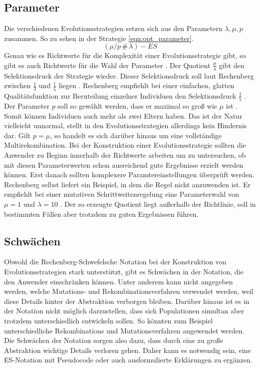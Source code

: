 \subsection{Parameter}
Die verschiedenen Evolutionsstrategien setzen sich aus den Parametern $\lambda, \mu, p$ zusammen. So zu sehen in der Strategie \ref{eqn:opt_parameter}.
\begin{equation}
\label{eqn:opt_parameter}
(\mu/p\,\#\,\lambda)-ES
\end{equation}
Genau wie es Richtwerte für die Komplexität einer Evolutionsstrategie gibt, so gibt es auch Richtwerte für die Wahl der Parameter \cite[S.166]{schoeneburg}.
Der Quotient $\frac{\mu}{\lambda}$ gibt den Selektionsdruck der Strategie wieder. Dieser Selektionsdruck soll laut Rechenberg zwischen $\frac{1}{3}$ und $\frac{1}{5}$ liegen  \cite[S.166]{schoeneburg}. Rechenberg empfiehlt bei einer einfachen, glatten Qualitätsfunktion zur Beruteilung einzelner Individuen den Selektionsdruck  $\frac{1}{5}$  \cite[S.166]{schoeneburg}.
Der Parameter $p$ soll so gewählt werden, dass er maximal so groß wie $\mu$ ist  \cite[S.166]{schoeneburg}. Somit können Individuen auch mehr als zwei Eltern haben. Das ist der Natur vielleicht unnormal, stellt in den Evolutionsstrategien allerdings kein Hindernis dar. Gilt $p=\mu$, so handelt es sich darüber hinaus um eine vollständige Multirekombination.
Bei der Konstruktion einer Evolutionsstrategie sollten die Anwender zu Beginn innerhalb der Richtwerte arbeiten um zu untersuchen, ob mit diesen Parameterwerten schon ausreichend gute Ergebnisse erzielt werden können. Erst danach sollten komplexere Paramtereinstellungen überprüft werden.
Rechenberg selbst liefert ein Beispiel, in dem die Regel nicht anzuwenden ist. Er empfiehlt bei einer mutativen Schrittweitenregelung eine Parameterwahl von $\mu=1$ und $\lambda=10$ \cite[S.166]{schoeneburg}. Der so erzeugte Quotient liegt außerhalb der Richtlinie, soll in bestimmten Fällen aber trotzdem zu guten Ergebnissen führen.

\subsection{Schwächen}
Obwohl die Rechenberg-Schwefelsche Notation bei der Konstruktion von Evolutionsstrategien stark unterstützt, gibt es Schwächen in der Notation, die den Anwender einschränken können.
Unter anderem kann nicht angegeben werden, welche Mutations- und Rekombinationsverfahren verwendet werden, weil diese Details hinter der Abstraktion verborgen bleiben.
Darüber hinaus ist es in der Notation nicht möglich darzustellen, dass sich Populationen simultan aber trotzdem unterschiedlich entwickeln sollen. So könnten zum Beispiel unterschiedliche Rekombinations und Mutationsverfahren angewendet werden.
Die Schwächen der Notation sorgen also dazu, dass durch eine zu große Abstraktion wichtige Details verloren gehen. Daher kann es notwendig sein, eine ES-Notation mit Pseudocode oder auch ausformulierte Erklärungen zu ergänzen. 